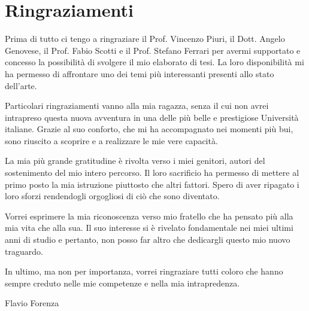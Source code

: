 \chapter*{Ringraziamenti}

Prima di tutto ci tengo a ringraziare il Prof. Vincenzo Piuri, il Dott. Angelo Genovese, il Prof. Fabio Scotti e il Prof. Stefano Ferrari per avermi supportato e concesso la possibilità di svolgere il mio elaborato di tesi. La loro disponibilità mi ha permesso di affrontare uno dei temi più interessanti presenti allo stato dell'arte.

Particolari ringraziamenti vanno alla mia ragazza, senza il cui non avrei intrapreso questa nuova avventura in una delle più belle e prestigiose Università italiane. Grazie al suo conforto, che mi ha accompagnato nei momenti più bui, sono riuscito a scoprire e a realizzare le mie vere capacità. 

La mia più grande gratitudine è rivolta verso i miei genitori, autori del sostenimento del mio intero percorso. Il loro sacrificio ha permesso di mettere al primo posto la mia istruzione piuttosto che altri fattori. Spero di aver ripagato i loro sforzi rendendogli orgogliosi di ciò che sono diventato.

Vorrei esprimere la mia riconoscenza verso mio fratello che ha pensato più alla mia vita che alla sua. Il suo interesse si è rivelato fondamentale nei miei ultimi anni di studio e pertanto, non posso far altro che dedicargli questo mio nuovo traguardo.

In ultimo, ma non per importanza, vorrei ringraziare tutti coloro che hanno sempre creduto nelle mie competenze e nella mia intrapredenza. \newline

\hfill
Flavio Forenza